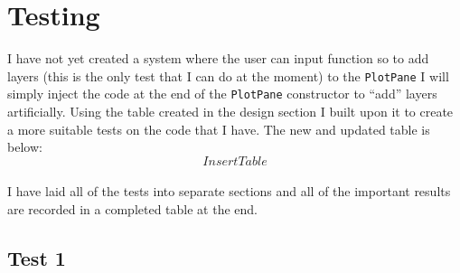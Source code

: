 \documentclass[../../../main.tex]{subfiles}
\begin{document}
\chapter{Testing}
I have not yet created a system where the user can input function so to add layers (this is the only test that I can do at the moment) to the \texttt{PlotPane} I will simply inject the code at the end of the \texttt{PlotPane} constructor to ``add'' layers artificially. Using the table created in the design section I built upon it to create a more suitable tests on the code that I have. The new and updated table is below:\\
\[Insert Table\]
\\
I have laid all of the tests into separate sections and all of the important results are recorded in a completed table at the end.
\section{Test 1}
\newpage
\end{document}
